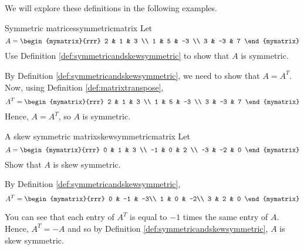 We will explore these definitions in the following examples.

\begin{example}{Symmetric matrices}{symmetricmatrix}
Let
\begin{equation*}
A=\begin{mymatrix}{rrr}
2 & 1 & 3 \\
1 & 5 & -3 \\
3 & -3 & 7
\end{mymatrix} 
\end{equation*}
Use Definition \ref{def:symmetricandskewsymmetric} to show that $A$ is symmetric. 
\end{example}

\begin{solution}
By Definition \ref{def:symmetricandskewsymmetric}, we need to show that $A = A^T$. 
Now, using Definition \ref{def:matrixtranspose}, 
\begin{equation*}
A^{T} = \begin{mymatrix}{rrr}
2 & 1 & 3 \\
1 & 5 & -3 \\
3 & -3 & 7
\end{mymatrix}
\end{equation*}
Hence, $A = A^{T}$, so $A$ is symmetric.
\end{solution}

\begin{example}{A skew symmetric matrix}{skewsymmetricmatrix}
Let
\begin{equation*}
A=\begin{mymatrix}{rrr}
0 & 1 & 3 \\
-1 & 0 & 2 \\
-3 & -2 & 0
\end{mymatrix} 
\end{equation*}
Show that $A$ is skew symmetric.
\end{example}

\begin{solution} By Definition \ref{def:symmetricandskewsymmetric}, 
\begin{equation*}
A^{T} = \begin{mymatrix}{rrr}
0 & -1 & -3\\
1 &  0 & -2\\
3 &  2 &  0
\end{mymatrix} 
\end{equation*}

You can see that each entry of $A^T$ is equal to $-1$ times the same entry of $A$. 
Hence, $A^{T} = - A$ and so by Definition \ref{def:symmetricandskewsymmetric}, $A$ is skew symmetric. 
\end{solution}
